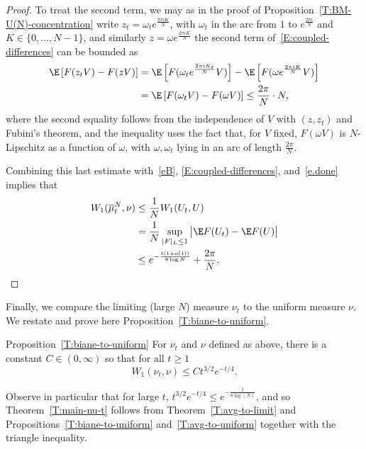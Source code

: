 \begin{proof}
To treat the second term, we may as in the proof of Proposition~\ref{T:BM-U(N)-concentration} write $z_t=\omega_te^{\frac{2\pi i K}{N}}$, with $\omega_t$ in the arc from $1$ to $e^{\frac{2\pi i}{N}}$ and $K\in\{0,\ldots,N-1\}$, and similarly $z=\omega e^{\frac{2\pi i K}{N}}$ the second term of~\eqref{E:coupled-differences} can be bounded as
\begin{align*}
\E\left[F(z_tV)-F(zV)\right] &=\E\left[F(\omega_te^{\frac{2\pi i K_t}{N}}V)\right]-\E\left[F(\omega e^{\frac{2\pi i K}{N}}V)\right] \\
&= \E\left[F(\omega_tV)-F(\omega V)\right]
\le \frac{2\pi}{N}\cdot N,
\end{align*}
where the second equality follows from the independence of $V$ with $(z,z_t)$ and Fubini's theorem, and the inequality uses the fact that, for $V$ fixed, $F(\omega V)$ is $N$-Lipschitz as a function of $\omega$, with $\omega,\omega_t$ lying in an arc of length $\frac{2\pi}{N}$.

Combining this last estimate with~\eqref{eB}, \eqref{E:coupled-differences}, and~\eqref{e.done} implies that
\begin{equation*}
\begin{split}
W_1(\overline{\mu}^N_t,\nu)&\le\frac{1}{N}W_1(U_t,U)\\&=\frac{1}{N}\sup_{|F|_L\le1}\big|\E F(U_t)-\E F(U)\big|\\&\le e^{-\frac{t(1+o(1))}{8\log N}}+\frac{2\pi}{N}.
\end{split}
\end{equation*}
\end{proof}

Finally, we compare the limiting (large $N$) measure $\nu_t$ to the uniform measure $\nu$. We restate and prove here Proposition~\ref{T:biane-to-uniform}.

\begin{enonce*}{Proposition~\ref{T:biane-to-uniform}}
For $\nu_t$ and $\nu$ defined as above, there is a constant $C\in(0,\infty)$ so that for all $t\ge1$
\[
W_1(\nu_t,\nu)\le Ct^{3/2}e^{-t/4}.
\]
\end{enonce*}

Observe in particular that for large $t$, $t^{3/2}e^{-t/4}\le e^{-\frac{t}{8\log(N)}}$, and so Theorem~\ref{T:main-nu-t} follows from Theorem~\ref{T:avg-to-limit} and Propositions~\ref{T:biane-to-uniform} and~\ref{T:avg-to-uniform} together with the triangle inequality.

